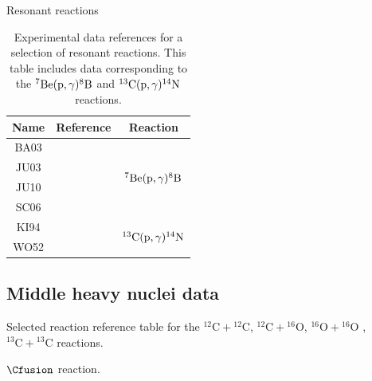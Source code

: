 \documentclass[openany]{book}
\begin{document}
Resonant reactions



\begin{table}[H]
	\centering
	\begin{tabular}{|c|c|c|}
		\hline
		Name & Reference & Reaction \\ \hline
		BA03 &\cite{baby_bordeanu_goldring_hass_weissman_fedoseyev_koster_nir-el_haquin_gaggeler_weinreich_et_2003}  &   \multirow{4}{*}{$\BeRadiativeCapture$}       \\ \cline{1-2}
		JU03 &  \cite{junghans_mohrmann_snover_steiger_adelberger_casandjian_swanson_buchmann_park_zyuzin_et_2003}  &         \\ \cline{1-2}
		JU10 &    \cite{junghans_snover_mohrmann_adelberger_buchmann_2010}  &     \\ \cline{1-2}
		SC06 &     \cite{schumann_typel_hammache_summerer_uhlig_bottcher_cortina_forster_gai_geissel_et_2006} & \\  \hline
		KI94 &    \cite{king_azuma_vise_gorres_rolfs_trautvetter_vlieks_1994} &   \multirow{2}{*}{$\CRadiativeCapture$}         \\ \cline{1-2}
		WO52 &   \cite{woodbury_fowler_1952}
		 &      \\ \hline
	\end{tabular}
	\caption[References $\BeRadiativeCapture$ and $\CRadiativeCapture$ experimental data]{Experimental data references for a selection of resonant reactions. This table includes data corresponding to the $\BeRadiativeCapture$ and $\CRadiativeCapture$ reactions.}
	\label{table:light_resonant}
\end{table}



\subsection{Middle heavy nuclei data} \label{sub:middleHeavyData}

Selected reaction reference table for the $\mathrm{{}^{12}C + {}^{12}C}$, $\mathrm{{}^{12}C + {}^{16}O}$,  $\mathrm{{}^{16}O + {}^{16}O}$ ,  $\mathrm{{}^{13}C + {}^{13}C}$ reactions. 

$\Cfusion$ reaction.
\end{document}
